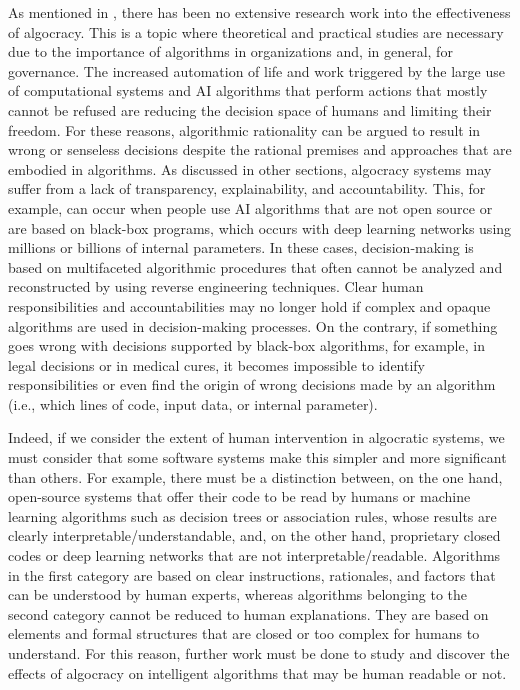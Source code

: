 As mentioned in \citet{chap:9:Lorenzetal:2021}, there has been no extensive research work into the effectiveness of algocracy. This is a topic where theoretical and practical studies are necessary due to the importance of algorithms in organizations and, in general, for governance. The increased automation of life and work triggered by the large use of computational systems and AI algorithms that perform actions that mostly cannot be refused are reducing the decision space of humans and limiting their freedom. For these reasons, algorithmic rationality can be argued to result in wrong or senseless decisions despite the rational premises and approaches that are embodied in algorithms. As discussed in other sections, algocracy systems may suffer from a lack of transparency, explainability, and accountability. This, for example, can occur when people use AI algorithms that are not open source or are based on black-box programs, which occurs with deep learning networks using millions or billions of internal parameters. In these cases, decision-making is based on multifaceted algorithmic procedures that often cannot be analyzed and reconstructed by using reverse engineering techniques. Clear human responsibilities and accountabilities may no longer hold if complex and opaque algorithms are used in decision-making processes. On the contrary, if something goes wrong with decisions supported by black-box algorithms, for example, in legal decisions or in medical cures, it becomes impossible to identify responsibilities or even find the origin of wrong decisions made by an algorithm (i.e., which lines of code, input data, or internal parameter).

Indeed, if we consider the extent of human intervention in algocratic systems, we must consider that some software systems make this simpler and more significant than others. For example, there must be a distinction between, on the one hand, open-source systems that offer their code to be read by humans or machine learning algorithms such as decision trees or association rules, whose results are clearly interpretable/{\allowbreak}understandable, and, on the other hand, proprietary closed codes or deep learning networks that are not interpretable/{\allowbreak}readable. Algorithms in the first category are based on clear instructions, rationales, and factors that can be understood by human experts, whereas algorithms belonging to the second category cannot be reduced to human explanations. They are based on elements and formal structures that are closed or too complex for humans to understand. For this reason, further work must be done to study and discover the effects of algocracy on intelligent algorithms that may be human readable or not.

